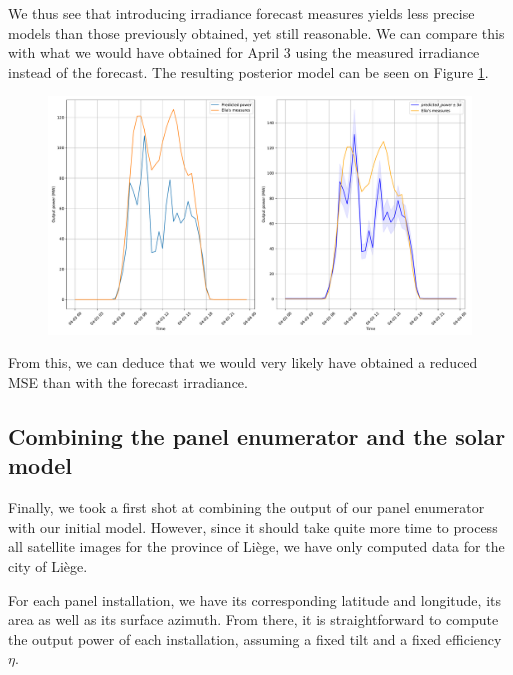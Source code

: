 \documentclass[a4paper, 12pt]{article}
\begin{document}
We thus see that introducing irradiance forecast measures yields less precise models than those previously obtained, yet still reasonable. We can compare this with what we would have obtained for April 3 using the measured irradiance instead of the forecast. The resulting posterior model can be seen on Figure \ref{fig:naive_post_meas}.
\begin{figure}[H]
    \centering
    \includegraphics[width=\textwidth]{resources/pdf/comparison_naive_posterior_27-03-2020_meas.pdf}
    \label{fig:naive_post_meas}
\end{figure}
From this, we can deduce that we would very likely have obtained a reduced MSE than with the forecast irradiance.

\subsection{Combining the panel enumerator and the solar model}
Finally, we took a first shot at combining the output of our panel enumerator with our initial model. However, since it should take quite more time to process all satellite images for the province of Liège, we have only computed data for the city of Liège.

For each panel installation, we have its corresponding latitude and longitude, its area as well as its surface azimuth. From there, it is straightforward to compute the output power of each installation, assuming a fixed tilt and a fixed efficiency $\eta$.
\end{document}
